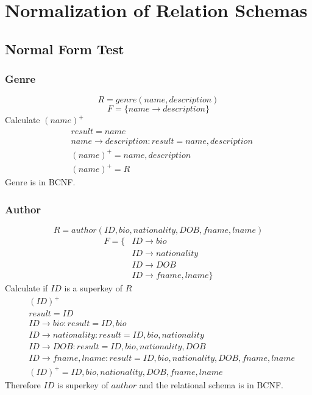 \documentclass[fleqn]{scrreprt}
\begin{document}
\section{Normalization of Relation Schemas}
\subsection{Normal Form Test}
\subsubsection{Genre}
\begin{equation*}
    R = genre(name, description)
\end{equation*}
\begin{equation*}
    F = \{name \rightarrow description\}
\end{equation*}
Calculate $(name)^+$
\begin{align*}
    & result = name\\
    & name \rightarrow description : result = name, description\\
    & (name)^+ = name, description\\
    & (name)^+ = R
\end{align*}
Genre is in BCNF.

\subsubsection{Author}
\begin{equation*}
    R = author(ID, bio, nationality, DOB, fname, lname)
\end{equation*}
\begin{align*}
    F = \{ & ID \rightarrow bio\\
          & ID \rightarrow nationality\\
          & ID \rightarrow DOB\\
          & ID \rightarrow fname, lname \}
\end{align*}
Calculate if $ID$ is a superkey of $R$
\begin{align*}
    & (ID)^+\\
    & result = ID\\
    & ID \rightarrow bio : result = ID, bio\\
    & ID \rightarrow nationality : result = ID, bio, nationality\\
    & ID \rightarrow DOB : result = ID, bio, nationality, DOB\\
    & ID \rightarrow fname, lname : result = ID, bio, nationality, DOB, fname, lname\\
    & (ID)^+ = ID, bio, nationality, DOB, fname, lname
\end{align*}
Therefore $ID$ is superkey of $author$ and the relational schema is in BCNF.
\end{document}
